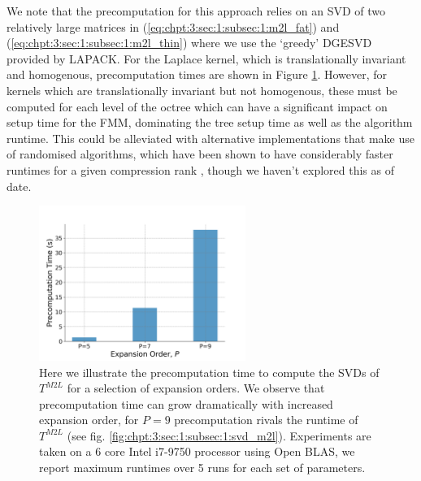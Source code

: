 We note that the precomputation for this approach relies on an SVD of two relatively large matrices in (\ref{eq:chpt:3:sec:1:subsec:1:m2l_fat}) and (\ref{eq:chpt:3:sec:1:subsec:1:m2l_thin}) where we use the `greedy' DGESVD provided by LAPACK. For the Laplace kernel, which is translationally invariant and homogenous, precomputation times are shown in Figure \ref{fig:chpt:3:sec:1:subsec:1:svd_m2l_precomputation}. However, for kernels which are translationally invariant but not homogenous, these must be computed for each level of the octree which can have a significant impact on setup time for the FMM, dominating the tree setup time as well as the algorithm runtime. This could be alleviated with alternative implementations that make use of randomised algorithms, which have been shown to have considerably faster runtimes for a given compression rank \cite{halko2011finding}, though we haven't explored this as of date.

\begin{figure}
    \centering
    \includegraphics[width=0.6\textwidth]{images/ch_3/svd_m2l_precomputation.png}
    \caption{Here we illustrate the precomputation time to compute the SVDs of $T^{M2L}$ for a selection of expansion orders. We observe that precomputation time can grow dramatically with increased expansion order, for $P=9$ precomputation rivals the runtime of $T^{M2L}$ (see fig. \ref{fig:chpt:3:sec:1:subsec:1:svd_m2l}). Experiments are taken on a 6 core Intel i7-9750 processor using Open BLAS, we report maximum runtimes over 5 runs
    for each set of parameters.}
    \label{fig:chpt:3:sec:1:subsec:1:svd_m2l_precomputation}
\end{figure}